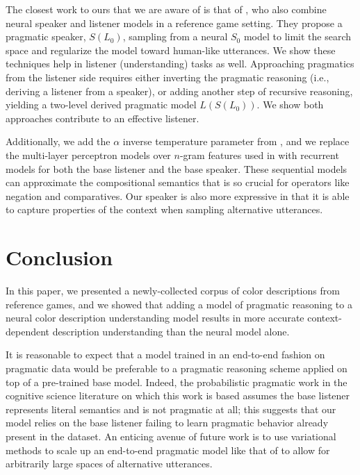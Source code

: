 \documentclass[11pt,letterpaper]{article}
\newcommand{\Listener}{L}
\newcommand{\Speaker}{S}
\renewcommand{\|}{\mid}
\begin{document}
The closest work to ours that we are aware of is that of
, who also combine neural speaker
and listener models in a reference game setting. They propose a
pragmatic speaker, $\Speaker(\Listener_0)$, sampling from a neural
$\Speaker_0$ model to limit the search space and regularize the model toward
human-like utterances. We show these techniques help in
listener (understanding) tasks as well. Approaching pragmatics from the listener
side requires either inverting the pragmatic reasoning (i.e., deriving a
listener from a speaker), or adding another step of recursive reasoning,
yielding a two-level derived pragmatic model
$\Listener(\Speaker(\Listener_0))$. We show both approaches contribute
to an effective listener.

Additionally, we add the $\alpha$ inverse temperature parameter from
, and we replace the multi-layer perceptron models over
$n$-gram features used in 
with recurrent models for both the base listener and the base speaker.
These sequential models can approximate the compositional semantics
that is so crucial for operators like negation and comparatives.
Our speaker is also more expressive in that it is able to capture
properties of the context when sampling alternative utterances.

\section{Conclusion} \label{sec:conclusion}

In this paper, we presented a newly-collected corpus of color descriptions from
reference games, and we showed that adding a model of pragmatic reasoning
to a neural color description understanding model results in more accurate
context-dependent description understanding than the neural model alone.

It is reasonable to expect that a model trained in an end-to-end fashion on
pragmatic data would be preferable to a pragmatic reasoning scheme applied on
top of a pre-trained base model.
Indeed, the probabilistic pragmatic work in the cognitive science literature
on which this work is based assumes the base listener represents literal semantics
and is not pragmatic at all; this suggests that our model relies on the base
listener failing to learn pragmatic behavior already present in the dataset.
An enticing avenue of future work is to use variational methods to scale
up an end-to-end pragmatic model like that of  to
allow for arbitrarily large spaces of alternative utterances.
\end{document}
